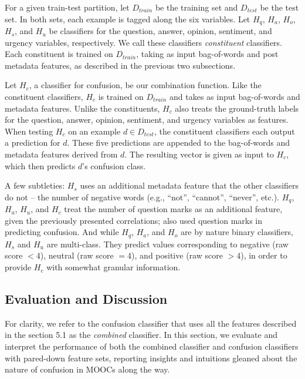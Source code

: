 \documentclass{edm_template}
\begin{document}
For a given train-test partition, let $D_{train}$ be the training set and $D_{test}$ be the test set. In both sets, each example is tagged along the six variables. Let $H_{q}$, $H_{a}$, $H_{o}$, $H_{s}$, and $H_{u}$ be classifiers for the question, answer, opinion, sentiment, and urgency variables, respectively. We call these classifiers \emph{constituent} classifiers. Each constituent is trained on $D_{train}$, taking as input bag-of-words and post metadata features, as described in the previous two subsections. 

Let $H_{c}$, a classifier for confusion, be our combination function. Like the constituent classifiers, $H_{c}$ is trained on $D_{train}$ and takes as input bag-of-words and metadata features. Unlike the constituents, $H_{c}$ also treats the ground-truth labels for the question, answer, opinion, sentiment, and urgency variables as features. When testing $H_{c}$ on an example $d \in D_{test}$, the constituent classifiers each output a prediction for $d$. These five predictions are appended to the bag-of-words and metadata features derived from $d$. The resulting vector is given as input to $H_{c}$, which then predicts $d$'s confusion class.

A few subtleties: $H_{s}$ uses an additional metadata feature that the other classifiers do not -- the number of negative words (e.g., ``not'', ``cannot'', ``never'', etc.). $H_{q}$, $H_{a}$, $H_{u}$, and $H_{c}$ treat the number of question marks as an additional feature, given the previously presented correlations; \cite{wen2015confusion} also used question marks in predicting confusion. And while $H_{q}$, $H_{a}$, and $H_{o}$ are by nature binary classifiers, $H_{s}$ and $H_{u}$ are multi-class. They predict values corresponding to negative (raw score $< 4$), neutral (raw score $= 4$), and positive (raw score $> 4$), in order to provide $H_{c}$ with somewhat granular information.

\subsection{Evaluation and Discussion}
For clarity, we refer to the confusion classifier that uses all the features
described in the section 5.1 as the \emph{combined} classifier. In this section, we evaluate and interpret the performance of both the combined classifier and confusion classifiers with pared-down feature sets, reporting insights and intuitions gleaned about the nature of confusion in MOOCs along the way. 
\end{document}

